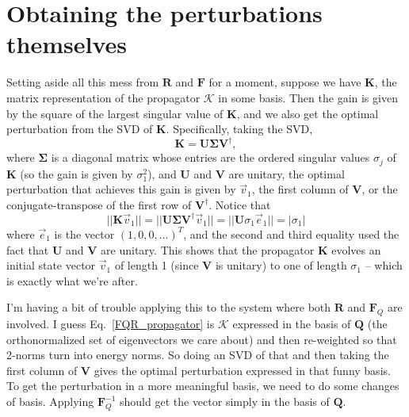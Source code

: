 \documentclass[aps,pop,preprint]{revtex4}
\begin{document}
\section{Obtaining the perturbations themselves}
Setting aside all this mess from $\mathbf{R}$ and $\mathbf{F}$ for a moment, suppose we have $\mathbf{K}$, the matrix representation of the propagator $\mathcal{K}$ in some basis. 
Then the gain is given by the square of the largest singular value of $\mathbf{K}$, and we also get the optimal perturbation from the SVD of $\mathbf{K}$. 
Specifically, taking the SVD,
\begin{equation}
    \mathbf{K} = \mathbf{U} \mathbf{\Sigma} \mathbf{V}^\dagger,
\end{equation}
where $\mathbf{\Sigma}$ is a diagonal matrix whose entries are the ordered singular values $\sigma_j$ of $\mathbf{K}$ (so the gain is given by $\sigma_1^2$), and $\mathbf{U}$ and $\mathbf{V}$ are unitary, the optimal perturbation that achieves this gain is given by $\vec{v}_1$, the first column of $\mathbf{V}$, or the conjugate-transpose of the first row of $\mathbf{V}^\dagger$. 
Notice that
\begin{equation}
    ||\mathbf{K} \vec{v}_1|| = ||\mathbf{U} \mathbf{\Sigma} \mathbf{V}^\dagger \vec{v}_1|| = ||\mathbf{U} \sigma_1 \vec{e}_1|| = |\sigma_1|
\end{equation}
where $\vec{e}_1$ is the vector $(1, 0, 0, ...)^T$, and the second and third equality used the fact that $\mathbf{U}$ and $\mathbf{V}$ are unitary.
This shows that the propagator $\mathbf{K}$ evolves an initial state vector $\vec{v}_1$ of length 1 (since $\mathbf{V}$ is unitary) to one of length $\sigma_1$ -- which is exactly what we're after.

I'm having a bit of trouble applying this to the system where both $\mathbf{R}$ and $\mathbf{F}_Q$ are involved. 
I guess Eq.~\eqref{FQR_propagator} is $\mathcal{K}$ expressed in the basis of $\mathbf{Q}$ (the orthonormalized set of eigenvectors we care about) and then re-weighted so that 2-norms turn into energy norms. 
So doing an SVD of that and then taking the first column of $\mathbf{V}$ gives the optimal perturbation expressed in that funny basis. 
To get the perturbation in a more meaningful basis, we need to do some changes of basis.
Applying $\mathbf{F}_Q^{-1}$ should get the vector simply in the basis of $\mathbf{Q}$.
\end{document}
